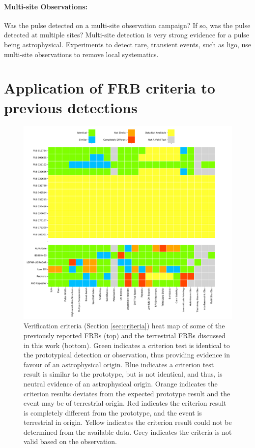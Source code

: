 \documentclass[a4paper,fleqn,usenatbib]{mnras}
\begin{document}
\paragraph{Multi-site Observations:}

Was the pulse detected on a multi-site observation campaign? If so, was the
pulse detected at multiple sites? Multi-site detection is very strong evidence
for a pulse being astrophysical. Experiments to detect rare, transient events,
such as \gls{ligo}, use multi-site observations to remove local systematics.

\section{Application of FRB criteria to previous detections}

\begin{figure}
    \includegraphics[width=1.0\linewidth]{verification/FRBheatmap.pdf}
    \caption{Verification criteria (Section \ref{sec:criteria}) heat map of some
    of the previously reported FRBs (top) and the terrestrial FRBs discussed in
    this work (bottom).  Green indicates a criterion test is identical to the
    prototypical detection or observation, thus providing evidence in favour of
    an astrophysical origin.  Blue indicates a criterion test result is similar
    to the prototype, but is not identical, and thus, is neutral evidence of an
    astrophysical origin.  Orange indicates the criterion results deviates from
    the expected prototype result and the event may be of terrestrial origin.
    Red indicates the criterion result is completely different from the
    prototype, and the event is terrestrial in origin. Yellow indicates the
    criterion result could not be determined from the available data.  Grey
    indicates the criteria is not valid based on the observation.
    }
    \label{fig:heat_map}
\end{figure}
\end{document}
